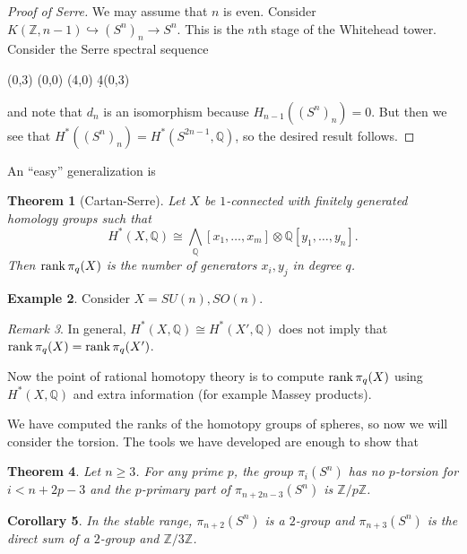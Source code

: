 \documentclass[leqno, openany]{memoir}
\newtheorem{thm}{Theorem}[section]
\newtheorem{cor}[thm]{Corollary}
\theoremstyle{definition}
\newtheorem{exm}[thm]{Example}
\theoremstyle{remark}
\newtheorem{rmk}[thm]{Remark}
\theoremstyle{plain}
\theoremstyle{definition}
\theoremstyle{remark}
\newcommand{\Z}{\mathbb{Z}}
\newcommand{\Q}{\mathbb{Q}}
\begin{document}
\begin{proof}[Proof of Serre]
    We may assume that $n$ is even. Consider $K(\Z, n-1) \hookrightarrow {(S^n)}_n \to S^n$. This is the $n$th stage of the Whitehead tower. Consider the Serre spectral sequence
\begin{center}
    \begin{sseqdata}[name=even, classes={draw=none}, cohomological Serre grading]
        \class["\Q"](0,3)
        \class["\Q"](0,0)
        \class["\Q"](4,0)
        \d4(0,3)
    \end{sseqdata}
    \printpage[name=even, page=4, grid=chess]
\end{center}
and note that $d_n$ is an isomorphism because $H_{n-1}({(S^n)}_n) = 0$. But then we see that $H^*({(S^n)}_n) = H^*(S^{2n-1}, \Q)$, so the desired result follows.
\end{proof}

An ``easy'' generalization is
\begin{thm}[Cartan-Serre]
    Let $X$ be $1$-connected with finitely generated homology groups such that 
    \[ H^*(X, \Q) \cong \bigwedge_{\Q}[x_1, \ldots, x_m] \otimes \Q[y_1, \ldots, y_n]. \]
    Then $\rank \pi_q(X)$ is the number of generators $x_i, y_j$ in degree $q$.
\end{thm}

\begin{exm}
    Consider $X = SU(n), SO(n)$.
\end{exm}

\begin{rmk}
    In general, $H^*(X, \Q) \cong H^*(X', \Q)$ does not imply that $\rank \pi_q(X) = \rank \pi_q(X')$.
\end{rmk}

Now the point of rational homotopy theory is to compute $\rank \pi_q(X)$ using $H^*(X, \Q)$ and extra information (for example Massey products).

We have computed the ranks of the homotopy groups of spheres, so now we will consider the torsion. The tools we have developed are enough to show that
\begin{thm}
    Let $n \geq 3$. For any prime $p$, the group $\pi_i(S^n)$ has no $p$-torsion for $i < n + 2p-3$ and the $p$-primary part of $\pi_{n+2n-3}(S^n)$ is $\Z/p\Z$.
\end{thm}

\begin{cor}
    In the stable range, $\pi_{n+2}(S^n)$ is a $2$-group and $\pi_{n+3}(S^n)$ is the direct sum of a $2$-group and $\Z/3\Z$.
\end{cor}
\end{document}

